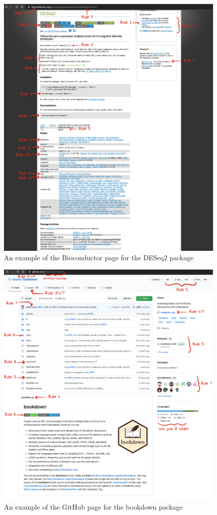 \documentclass[10pt,letterpaper]{article}
\begin{document}
\begin{figure}
\includegraphics[width=1\linewidth]{../figures/bioc_deseq2} \caption{An example of the Bioconductor page for the DESeq2 package}\label{fig:bioc_deseq2}
\end{figure}

\begin{figure}
\includegraphics[width=1\linewidth]{../figures/github_bookdown} \caption{An example of the GitHub page for the bookdown package}\label{fig:github_bookdown}
\end{figure}
\end{document}
